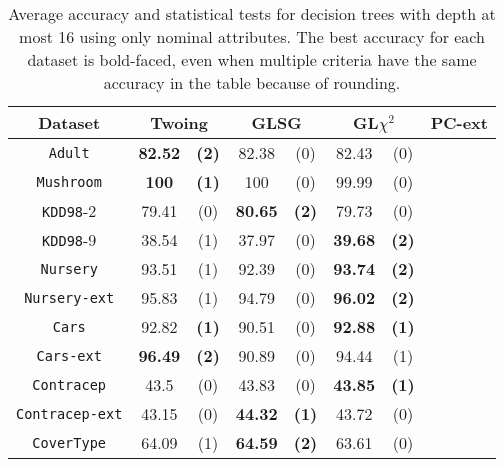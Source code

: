 \begin{table}
\small
\caption{Average accuracy and statistical tests  for  decision trees 
with depth at most 16 using only nominal attributes. The best accuracy for each dataset is bold-faced, even when multiple criteria have the same accuracy in the table because of rounding.}
\centering
\begin{tabular}{c|cc|cc|cc|cc} 
Dataset             & \multicolumn{2}{c|}{Twoing} &  \multicolumn{2}{c|}{GLSG}  &   \multicolumn{2}{c|}{GL$\chi^2$}  & \multicolumn{2}{c}{PC-ext}\\ \hline
{\tt Adult}         &  {\bf 82.52} & {\bf (2)}    &  82.38       &  (0)         &  82.43       & (0)         & &        \\
{\tt Mushroom}      &  {\bf 100}   & {\bf (1)}    &  100         &  (0)         &  99.99       & (0)         & &        \\
{\tt KDD98}-2       &  79.41       & (0)          &  {\bf 80.65} & {\bf (2)}    &  79.73       & (0)         & &        \\
{\tt KDD98}-9       &  38.54       & (1)          &  37.97       & (0)          &  {\bf 39.68} & {\bf (2)}   & &        \\
{\tt Nursery}       &  93.51       & (1)          &  92.39       & (0)          &  {\bf 93.74} & {\bf (2)}   & &        \\
{\tt Nursery-ext}   &  95.83       & (1)          &  94.79       & (0)          &  {\bf 96.02} & {\bf (2)}   & &        \\
{\tt Cars}          &  92.82       & {\bf (1)}    &  90.51       & (0)          &  {\bf 92.88} & {\bf (1)}   & &        \\
{\tt Cars-ext}      &  {\bf 96.49} & {\bf (2)}    &  90.89       & (0)          &  94.44       & (1)         & &        \\
{\tt Contracep}     &  43.5        & (0)          &  43.83       & (0)          &  {\bf 43.85} & {\bf (1)}   & &        \\
{\tt Contracep-ext} &  43.15       & (0)          &  {\bf 44.32} & {\bf (1)}    &  43.72       & (0)         & &        \\
{\tt CoverType}     &  64.09       & (1)          &  {\bf 64.59} & {\bf (2)}    &  63.61       & (0)         & &        \\

\end{tabular}
\end{table}
